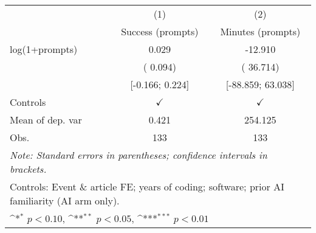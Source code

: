 \def\sym#1{\ifmmode^{#1}\else\(^{#1}\)\fi}
\begin{tabular}{l*{2}{c}}
\hline\hline
 & (1) & (2)
\\
 & Success (prompts) & Minutes (prompts)
 \\
\hline
log(1+prompts) &  0.029 & -12.910
\\
 & ( 0.094) & ( 36.714)
\\
 & [-0.166;  0.224] & [-88.859;  63.038]
\\
\hline
Controls & $\checkmark$ & $\checkmark$
\\
Mean of dep. var &  0.421 &  254.125
\\
Obs. & 133 & 133
\\
\hline
\hline\hline
\multicolumn{3}{l}{\it{Note:} Standard errors in parentheses; confidence intervals in brackets.}\\
\multicolumn{3}{l}{Controls: Event \& article FE; years of coding; software; prior AI familiarity (AI arm only).}\\
\multicolumn{3}{l}{\sym{*} $p<0.10$, \sym{**} $p<0.05$,  \sym{***} $p<0.01$}\\
\end{tabular}
